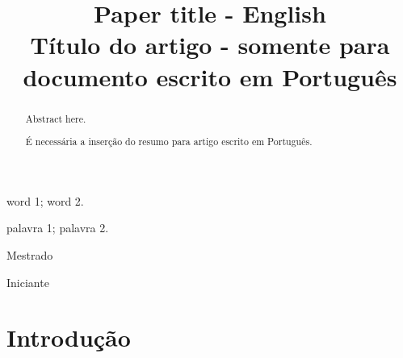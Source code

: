 \documentclass[conference]{IEEEtran}
\begin{document}
\title{Paper title - English \\ T\'{i}tulo do artigo - somente para documento escrito em Portugu\^{e}s}


\author{
}


\maketitle

\thispagestyle{fancy}

\renewcommand{\abstractname}{Abstract}
\begin{abstract}
Abstract here.
\end{abstract}

\renewcommand\IEEEkeywordsname{Keywords}
\begin{IEEEkeywords}
\label{Keywords}
word 1; word 2.
\end{IEEEkeywords}

\renewcommand{\abstractname}{Resumo}
\begin{abstract}
\label{Resumo}
\'E necess\'aria a inser\c{c}\~{a}o do resumo para artigo escrito em Portugu\^{e}s.
\end{abstract}

\renewcommand\IEEEkeywordsname{Palavras-chave}
\begin{IEEEkeywords}
\label{Palavras-chave}
palavra 1; palavra 2.
\end{IEEEkeywords}

\renewcommand\IEEEkeywordsname{Classifica\c{c}\~{a}o}
\begin{IEEEkeywords}
	\label{classificacao}
	Mestrado
\end{IEEEkeywords}

\renewcommand\IEEEkeywordsname{Categoria}
\begin{IEEEkeywords}
	\label{Categoria}
	Iniciante 
\end{IEEEkeywords}

\IEEEpeerreviewmaketitle


\section{Introdução}

\end{document}
